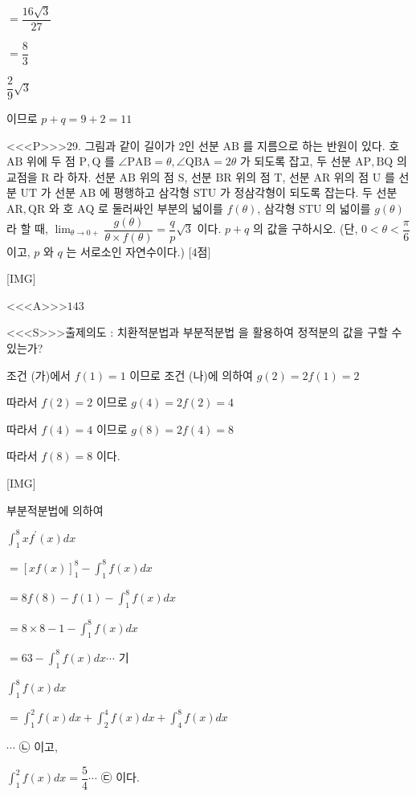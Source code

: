 \documentclass{oblivoir}
\begin{document}
$=\dfrac{16 \sqrt{3}}{27}$

$=\dfrac{8}{3}$

$\dfrac{2}{9} \sqrt{3}$

이므로 $p+q=9+2=11$


<<<P>>>29. 그림과 같이 길이가 $2$인 선분 $\mathrm{AB}$ 를 지름으로 하는 반원이 있다. 호 $\mathrm{AB}$ 위에 두 점 $\mathrm{P}, \mathrm{Q}$ 를 $\angle \mathrm{PAB}=\theta, \angle \mathrm{QBA}=2 \theta$ 가 되도록 잡고, 두 선분 $\mathrm{AP}, \mathrm{BQ}$ 의 교점을 $\mathrm{R}$ 라 하자.
선분 $\mathrm{AB}$ 위의 점 $\mathrm{S}$, 선분 $\mathrm{BR}$ 위의 점 $\mathrm{T}$, 선분 $\mathrm{AR}$ 위의 점 $\mathrm{U}$ 를 선분 $\mathrm{UT}$ 가 선분 $\mathrm{AB}$ 에 평행하고 삼각형 $\mathrm{STU}$ 가 정삼각형이 되도록 잡는다. 두 선분 $\mathrm{AR}, \mathrm{QR}$ 와 호 $\mathrm{AQ}$ 로 둘러싸인 부분의 넓이를 $f(\theta)$, 삼각형 $\mathrm{STU}$ 의 넓이를 $g(\theta)$ 라 할 때, $\displaystyle\lim _{\theta \rightarrow 0+} \dfrac{g(\theta)}{\theta \times f(\theta)}=\dfrac{q}{p} \sqrt{3}$ 이다. $p+q$ 의 값을 구하시오. (단, $0< \theta< \dfrac{\pi}{6}$ 이고, $p$ 와 $q$ 는 서로소인 자연수이다.) [4점]

[IMG]

<<<A>>>$143$

<<<S>>>출제의도 : 치환적분법과 부분적분법 을 활용하여 정적분의 값을 구할 수 있는가?

조건 (가)에서 $f(1)=1$ 이므로 조건 (나)에 의하여
$g(2)=2 f(1)=2$

따라서 $f(2)=2$ 이므로
$g(4)=2 f(2)=4$

따라서 $f(4)=4$ 이므로
$g(8)=2 f(4)=8$

따라서 $f(8)=8$ 이다.

[IMG]

부분적분법에 의하여

$\displaystyle\int_{1}^{8} x f^{\prime}(x) d x$

$=[x f(x)]_{1}^{8}-\displaystyle\int_{1}^{8} f(x) d x$

$=8 f(8)-f(1)-\displaystyle\int_{1}^{8} f(x) d x$

$=8 \times 8-1-\displaystyle\int_{1}^{8} f(x) d x$

$=63-\displaystyle\int_{1}^{8} f(x) d x \cdots$ 기

$\displaystyle\int_{1}^{8} f(x) d x$

$=\displaystyle\int_{1}^{2} f(x) d x+\displaystyle\int_{2}^{4} f(x) d x+\displaystyle\int_{4}^{8} f(x) d x$

$\cdots$ ㉡
이고,

$\displaystyle\int_{1}^{2} f(x) d x=\dfrac{5}{4} \cdots$ ㉢
이다.
\end{document}
